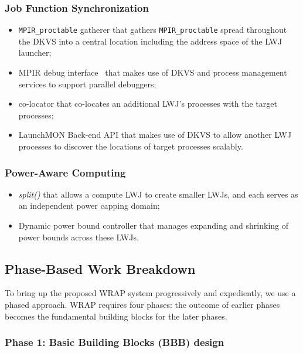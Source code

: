 \subsubsection{Job Function Synchronization}
\begin{itemize}
\item{{\tt MPIR\_proctable} gatherer that gathers {\tt MPIR\_proctable} spread throughout the
DKVS into a central location including the address space of the LWJ launcher;}
\item{MPIR debug interface~\cite{MPIRInterface} that makes use of DKVS and process
management services to support parallel debuggers;}
\item{co-locator that co-locates an additional LWJ's processes with
the target processes;}
\item{LaunchMON Back-end API that makes use of DKVS to allow another LWJ processes
to discover the locations of target processes scalably.}
\end{itemize}

\subsubsection{Power-Aware Computing}
\begin{itemize}
\item{{\em split()} that allows a compute LWJ to create smaller LWJs, and each serves as an independent power capping domain;}
\item{Dynamic power bound controller that manages expanding and shrinking of power bounds across these LWJs.}
\end{itemize}

\subsection{Phase-Based Work Breakdown}
To bring up the proposed WRAP system progressively and expediently, we use a phased approach.
WRAP requires four phases: the outcome of earlier phases becomes the fundamental 
building blocks for the later phases.

\subsubsection{Phase 1: Basic Building Blocks (BBB) design}

